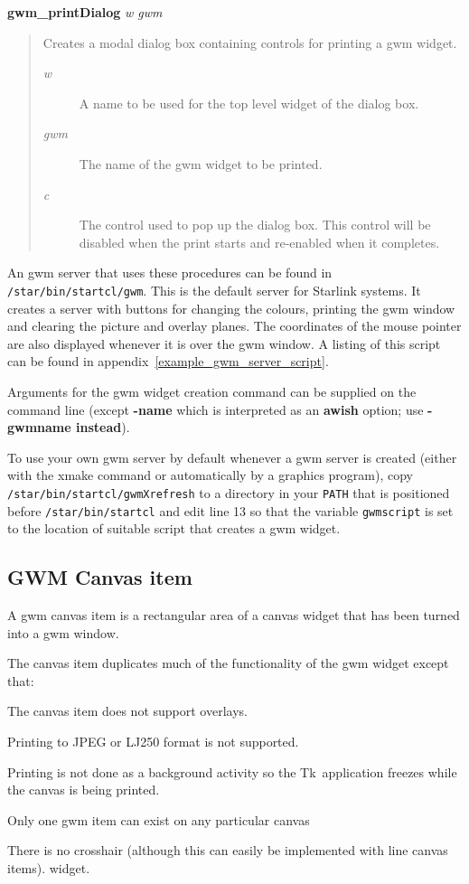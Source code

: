 \documentclass[twoside,11pt,nolof]{starlink}
\newenvironment{rquote}{\begin{quote}\raggedright}{\end{quote}}
\providecommand{\Tk}{{\textsf{Tk}}}
\begin{document}
\textbf{gwm\_printDialog} \emph{w gwm}
\begin{rquote}
Creates a modal dialog box containing controls for printing a gwm widget.
\begin{description}
\item[\emph{w}] A name to be used for the top level widget of the dialog box.
\item[\emph{gwm}] The name of the gwm widget to be printed.
\item[\emph{c}] The control used to pop up the dialog box. This control will
be disabled when the print starts and re-enabled when it completes.
\end{description}
\end{rquote}

An gwm server that uses these procedures can be found in
{\tt{/star/bin/startcl/gwm}}.  This is the default server for Starlink
systems.  It creates a server with buttons for changing the colours,
printing the gwm window and clearing the picture and overlay planes.
The coordinates of the mouse pointer are also displayed whenever it is
over the gwm window.  A listing of this script can be found in
appendix~\ref{example_gwm_server_script}.

Arguments for the gwm widget creation command can be supplied on the command
line (except \textbf{-name} which is interpreted as an \textbf{awish} option; use
\textbf{-gwmname instead}).

To use your own gwm server by default whenever a gwm server
is created (either with the xmake command or automatically by a
graphics program), copy {\tt{/star/bin/startcl/gwmXrefresh}} to a
directory in your {\tt{PATH}} that is positioned before
{\tt{/star/bin/startcl}} and edit line 13 so that the variable \texttt{gwmscript} is set to the location of suitable script that creates a gwm
widget.

\subsection{\label{gwm_canvas_item}GWM Canvas item}

A gwm canvas item is a rectangular area of a canvas widget that has been
turned into a gwm window.

The canvas item duplicates much of the functionality of the gwm widget
except that:

\begin{description}
\item The canvas item does not support overlays.
\item Printing to JPEG or LJ250 format is not supported.
\item Printing is not done as a background activity so the \Tk\ application
freezes while the canvas is being printed.
\item Only one gwm item can exist on any particular canvas
\item There is no crosshair (although this can easily be implemented with
line canvas items).
widget.
\end{description}
\end{document}

